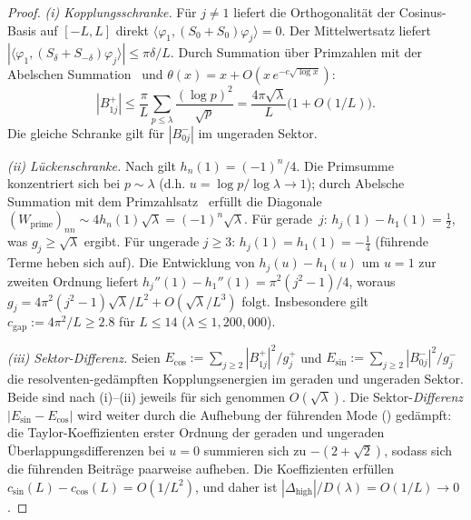 \documentclass[11pt,a4paper]{article}
\theoremstyle{remark}
\theoremstyle{plain}
\begin{document}
\begin{proof}
\sloppy
\emph{(i) Kopplungsschranke.} Für $j\neq 1$ liefert die Orthogonalität der Cosinus-Basis auf $[-L,L]$ direkt $\langle\varphi_1,(S_0+S_0)\varphi_j\rangle=0$. Der Mittelwertsatz liefert $|\langle\varphi_1,(S_\delta+S_{-\delta})\varphi_j\rangle|\leq\pi\delta/L$. Durch Summation über Primzahlen mit der Abelschen Summation~\cite{IwaniecKowalski2004} und $\theta(x)=x+O(x\,e^{-c\sqrt{\log x}})$:
\[
  |B_{1j}^+|\leq\frac{\pi}{L}\sum_{p\leq\lambda}\frac{(\log p)^2}{\sqrt p}
  =\frac{4\pi\sqrt\lambda}{L}\bigl(1+O(1/L)\bigr).
\]
Die gleiche Schranke gilt für $|B_{0j}^-|$ im ungeraden Sektor.

\emph{(ii) Lückenschranke.} Nach  gilt $h_n(1)=(-1)^n/4$. Die Primsumme konzentriert sich bei $p\sim\lambda$ (d.h. $u=\log p/\log\lambda\to 1$); durch Abelsche Summation mit dem Primzahlsatz~\cite{IwaniecKowalski2004} erfüllt die Diagonale $(W_{\mathrm{prime}})_{nn}\sim 4h_n(1)\sqrt\lambda=(-1)^n\sqrt\lambda$. Für gerade~$j$: $h_j(1)-h_1(1)=\tfrac12$, was $g_j\geq\sqrt\lambda$ ergibt. Für ungerade $j\geq 3$: $h_j(1)=h_1(1)=-\tfrac14$ (führende Terme heben sich auf). Die Entwicklung von $h_j(u)-h_1(u)$ um $u=1$ zur zweiten Ordnung liefert $h_j''(1)-h_1''(1)=\pi^2(j^2-1)/4$, woraus $g_j=4\pi^2(j^2-1)\sqrt\lambda/L^2+O(\sqrt\lambda/L^3)$ folgt. Insbesondere gilt $c_{\mathrm{gap}}:=4\pi^2/L\geq 2.8$ für $L\leq 14$ ($\lambda\leq 1{,}200{,}000$).

\emph{(iii) Sektor-Differenz.} Seien $E_{\cos}:=\sum_{j\geq 2}|B_{1j}^+|^2/g_j^+$ und $E_{\sin}:=\sum_{j\geq 2}|B_{0j}^-|^2/g_j^-$ die resolventen-gedämpften Kopplungsenergien im geraden und ungeraden Sektor. Beide sind nach (i)--(ii) jeweils für sich genommen $O(\sqrt\lambda)$. Die Sektor-\emph{Differenz} $|E_{\sin}-E_{\cos}|$ wird weiter durch die Aufhebung der führenden Mode () gedämpft: die Taylor-Koeffizienten erster Ordnung der geraden und ungeraden Überlappungsdifferenzen bei $u=0$ summieren sich zu $-(2+\sqrt{2})$, sodass sich die führenden Beiträge paarweise aufheben. Die Koeffizienten erfüllen $c_{\sin}(L)-c_{\cos}(L)=O(1/L^2)$, und daher ist $|\Delta_{\mathrm{high}}|/D(\lambda)=O(1/L)\to 0$.
\end{proof}
\end{document}
